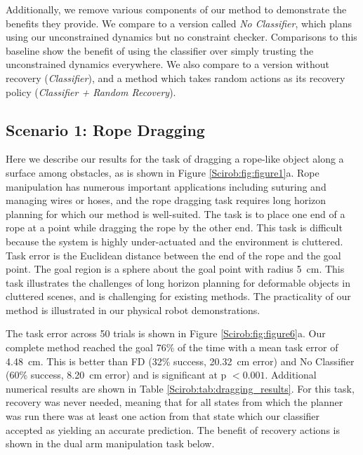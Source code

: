 Additionally, we remove various components of our method to demonstrate the benefits they provide. We compare to a version called \textit{No Classifier}, which plans using our unconstrained dynamics but no constraint checker. Comparisons to this baseline show the benefit of using the classifier over simply trusting the unconstrained dynamics everywhere. We also compare to a version without recovery (\textit{Classifier}), and a method which takes random actions as its recovery policy (\textit{Classifier + Random Recovery}).

\subsection{Scenario 1: Rope Dragging}
 
Here we describe our results for the task of dragging a rope-like object along a surface among obstacles, as is shown in Figure \ref{Scirob:fig:figure1}a. Rope manipulation has numerous important applications including suturing and managing wires or hoses, and the rope dragging task requires long horizon planning for which our method is well-suited. The task is to place one end of a rope at a point while dragging the rope by the other end. This task is difficult because the system is highly under-actuated and the environment is cluttered. Task error is the Euclidean distance between the end of the rope and the goal point. The goal region is a sphere about the goal point with radius \SI{5}{\centi\meter}. This task illustrates the challenges of long horizon planning for deformable objects in cluttered scenes, and is challenging for existing methods. The practicality of our method is illustrated in our physical robot demonstrations.

The task error across 50 trials is shown in Figure \ref{Scirob:fig:figure6}a. Our complete method reached the goal 76\% of the time with a mean task error of \SI{4.48}{\centi\meter}. This is better than FD (32\% success, \SI{20.32}{\centi\meter} error) and No Classifier (60\% success, \SI{8.20}{\centi\meter} error) and is significant at p $< 0.001$. Additional numerical results are shown in Table \ref{Scirob:tab:dragging_results}. For this task, recovery was never needed, meaning that for all states from which the planner was run there was at least one action from that state which our classifier accepted as yielding an accurate prediction. The benefit of recovery actions is shown in the dual arm manipulation task below.


